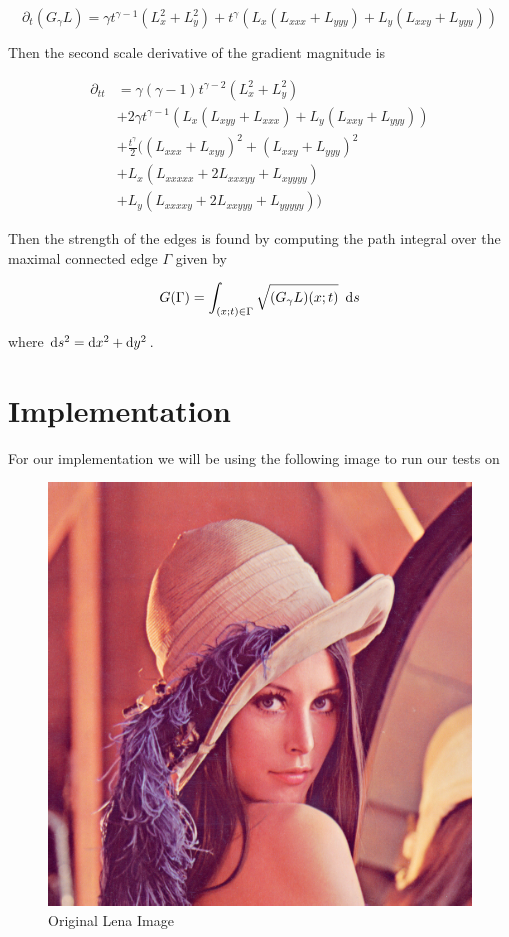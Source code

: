 \documentclass{article}
\begin{document}
\begin{equation}
  \partial_t (G_{\gamma}L) = \gamma t^{\gamma-1}(L_x^2+L_y^2) + t^{\gamma}(L_x(L_{xxx}+L_{yyy})+L_y(L_{xxy} + L_{yyy}))
\end{equation}

Then the second scale derivative of the gradient magnitude is

\begin{equation}
  \begin{align}
  \partial_{tt} &= \gamma(\gamma-1)t^{\gamma-2}(L_x^2+L_y^2) \\
   &+ 2\gamma t^{\gamma-1}(L_x(L_{xyy}+L_{xxx})+L_y(L_{xxy}+L_{yyy})) \\
   &+\frac{t^{\gamma}}{2}\big((L_{xxx}+L_{xyy})^2+(L_{xxy}+L_{yyy})^2 \\
   &+ L_x(L_{xxxxx}+2L_{xxxyy}+L_{xyyyy}) \\
   &+L_y(L_{xxxxy}+2L_{xxyyy}+L_{yyyyy})\big)
  \end{align}
\end{equation}


Then the strength of the edges is found by computing the path integral over the maximal connected edge $\Gamma$ given by

\begin{equation}
  G(\Gamma) = \int_{(x;t) \in \Gamma} \sqrt{(G_{\gamma}L)(x;t)} \,\, \operatorname{d \!} s
\end{equation}

where $\operatorname{d \!} s^2=\operatorname{d \!} x^2+\operatorname{d \!} y^2$.

\section{Implementation}
For our implementation we will be using the following image to run our tests on

\begin{figure}[H]
  \centering
  \includegraphics[scale=0.5]{Images/lena/lena_orig.png}
  \caption{Original Lena Image}
  \label{lena_o}
\end{figure}
\end{document}
